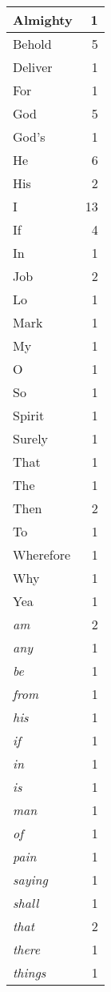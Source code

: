\begin{center}
\begin{longtable}{l|r}
\hline \hline
\endlastfoot
Almighty & 1 \\ \hline
Behold & 5 \\ \hline
Deliver & 1 \\ \hline
For & 1 \\ \hline
God & 5 \\ \hline
God's & 1 \\ \hline
He & 6 \\ \hline
His & 2 \\ \hline
I & 13 \\ \hline
If & 4 \\ \hline
In & 1 \\ \hline
Job & 2 \\ \hline
Lo & 1 \\ \hline
Mark & 1 \\ \hline
My & 1 \\ \hline
O & 1 \\ \hline
So & 1 \\ \hline
Spirit & 1 \\ \hline
Surely & 1 \\ \hline
That & 1 \\ \hline
The & 1 \\ \hline
Then & 2 \\ \hline
To & 1 \\ \hline
Wherefore & 1 \\ \hline
Why & 1 \\ \hline
Yea & 1 \\ \hline
\emph{am} & 2 \\ \hline
\emph{any} & 1 \\ \hline
\emph{be} & 1 \\ \hline
\emph{from} & 1 \\ \hline
\emph{his} & 1 \\ \hline
\emph{if} & 1 \\ \hline
\emph{in} & 1 \\ \hline
\emph{is} & 1 \\ \hline
\emph{man} & 1 \\ \hline
\emph{of} & 1 \\ \hline
\emph{pain} & 1 \\ \hline
\emph{saying} & 1 \\ \hline
\emph{shall} & 1 \\ \hline
\emph{that} & 2 \\ \hline
\emph{there} & 1 \\ \hline
\emph{things} & 1 \\ \hline

\end{longtable}
\end{center}
